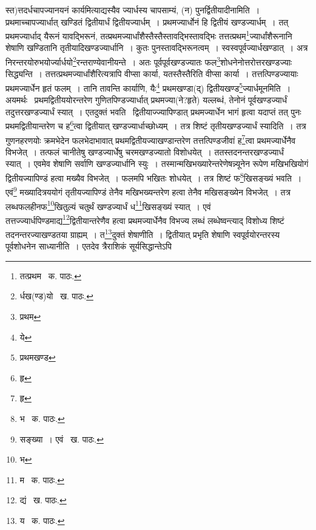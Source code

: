 \documentclass[11pt, openany]{book}
\begin{document}
\newpage

\noindent स्त)त्तदर्धचापज्यानयनं कार्यमित्याद्यस्यैव ज्यार्धस्य चापसाम्यं, (न) पुनर्द्वितीयादीनामिति~। प्रथमाच्चापज्यार्धात् खण्डितं द्वितीयार्धं
द्वितीयज्यार्धम्~। प्रथमज्यार्धोनं हि द्वितीयं खण्डज्यार्धम्~। तत् प्रथमज्यार्धाद् यैरूनं यावद्भिरूनं, तत्प्रथमज्यार्धांशैस्तैस्तैस्तावद्भिस्तावद्भिः
तत्तत्प्रथम\renewcommand{\thefootnote}{१}\footnote{तत्प्रथम \textendash\ क. पाठः.}ज्यार्धांशैरूनानि शेषाणि खण्डितानि तृतीयादिखण्डज्यार्धानि~। कुतः पुनस्तावद्भिरूनत्वम्~। स्वस्वपूर्वज्यार्धखण्डात्~। अत्र
निरन्तरयोरुभयोर्ज्यार्धयो\renewcommand{\thefootnote}{२}\footnote{र्धख(ण्ड)यो \textendash\ ख. पाठः.}रन्तराण्येवानीयन्ते~। अतः पूर्वपूर्वखण्डज्यातः फल\renewcommand{\thefootnote}{३}\footnote{प्रथम}शोधनेनोत्तरोत्तरखण्डज्याः सिद्ध्यन्ति~। तत्तत्प्रथमज्यार्धांशैरित्यत्रापि वीप्सा कार्या, यतस्तैस्तैरिति वीप्सा कार्या~। तत्तत्पिण्डज्यायाः प्रथमज्यार्धेन हृतं फलम्~। तानि तावन्ति कार्याणि, यैः\renewcommand{\thefootnote}{४}\footnote{ये} प्रथमखण्डा(द्) द्वितीयखण्ड\renewcommand{\thefootnote}{५}\footnote{प्रथमखण्ड}ज्यार्धमूनमिति~। अयमर्थः \textendash\ प्रथमद्वितीययोरन्तरेण गुणितपिण्डज्यार्धात् प्रथमज्या(ने?हृते) यल्लब्धं, तेनोनं पूर्वखण्डज्यार्धं तदुत्तरखण्डज्यार्धं स्यात्~। एतदुक्तं भवति \textendash\ द्वितीयाज्ज्यापिण्डात् प्रथमज्यार्धेन भागं हृत्वा यदाप्तं तत् पुनः प्रथमद्वितीयान्तरेण च ह\renewcommand{\thefootnote}{६}\footnote{हृ}त्वा द्वितीयात् खण्डज्यार्धाच्छोध्यम्~। तत्र शिष्टं तृतीयखण्डज्यार्धं स्यादिति~। तत्र गुणनहरणयोः क्रमभेदेन फलभेदाभावात् प्रथमद्वितीयज्याखण्डान्तरेण तत्तत्पिण्डजीवां ह\renewcommand{\thefootnote}{७}\footnote{हृ}त्वा प्रथमज्यार्धेनैव विभजेत्~। तत्फलं चानीतेषु खण्डज्यार्धेषु चरमखण्डज्यातो विशोधयेत्~। ततस्तदनन्तरखण्डज्यार्धं स्यात्~। एवमेव शेषाणि सर्वाणि खण्डज्यार्धानि स्युः~। तस्मान्मखिभख्यारेन्तरेणेषन्न्यूनेन रूपेण मखिभखियोगं द्वितीयज्यापिण्डं हत्वा मख्यैव विभजेत्~। फलमपि भखितः शोधयेत्~। तत्र शिष्टं फ\renewcommand{\thefootnote}{८}\footnote{भ \textendash\ क. पाठः.}खिसङ्ख्यं भवति~। एवं\renewcommand{\thefootnote}{९}\footnote{सङ्ख्या~। एवं \textendash\ ख. पाठः.} मख्यादित्रययोगं तृतीयज्यापिण्डं तेनैव मखिभख्यन्तरेण हत्वा तेनैव मखिसङ्ख्येन विभजेत्~। तत्र लब्धफलहीनफ\renewcommand{\thefootnote}{१०}\footnote{भ}खितुल्यं चतुर्थं खण्डज्यार्धं ध\renewcommand{\thefootnote}{११}\footnote{म \textendash\ क. पाठः.}खिसङ्ख्यं स्यात्~। एवं
तत्तज्ज्यार्धपिण्डमाद्य\renewcommand{\thefootnote}{१२}\footnote{द्यं \textendash\ ख. पाठः.}द्वितीयान्तरेणैव हत्वा प्रथमज्यार्धेनैव विभज्य लब्धं लब्धेष्वन्त्याद् विशोध्य शिष्टं तदनन्तरज्याखण्डतया ग्राह्यम्~। त\renewcommand{\thefootnote}{१३}\footnote{य \textendash\ क. पाठः.}दुक्तं शेषाणीति~। द्वितीयात् प्रभृति शेषाणि स्वपूर्वयोरन्तरस्य पूर्वशोधनेन साध्यानीति~। एतदेव त्रैराशिकं सूर्यसिद्धान्तेऽपि\textendash 
\end{document}
